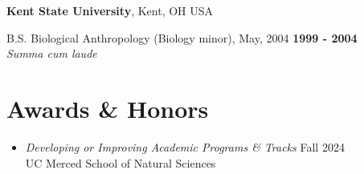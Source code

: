 \documentclass[margin,line,12pt]{res}
\newenvironment{list1}{
  \begin{list}{\ding{113}}{%
      \setlength{\itemsep}{0in}
      \setlength{\parsep}{0in} \setlength{\parskip}{0in}
      \setlength{\topsep}{0in} \setlength{\partopsep}{0in}
      \setlength{\leftmargin}{0.17in}}}{\end{list}}
\newenvironment{list2}{
  \begin{list}{$\bullet$}{%
      \setlength{\itemsep}{0in}
      \setlength{\parsep}{0in} \setlength{\parskip}{0in}
      \setlength{\topsep}{0in} \setlength{\partopsep}{0in}
      \setlength{\leftmargin}{0.2in}}}{\end{list}}
\begin{document}
\begin{resume}
{\bf Kent State University}, Kent, OH USA\\
\vspace*{-.1in}
\begin{list1}
\item[] B.S. Biological Anthropology (Biology minor),  May, 2004 \hfill {\bf 1999 - 2004} \\
\emph{Summa cum laude}
\end{list1}

\section{\sc Awards \& Honors}
\begin{itemize}
  \item \emph{Developing or Improving Academic Programs \& Tracks} \hfill Fall 2024 \\ UC Merced School of Natural Sciences
\end{itemize}

%
%
%



\end{resume}
\end{document}
